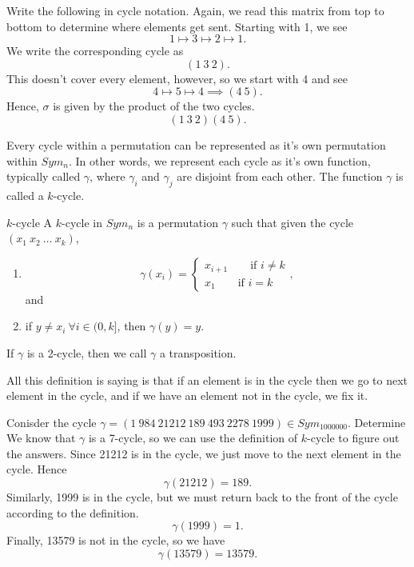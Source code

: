 \begin{example}{Write the following in cycle notation.}
	{\egft{
		\[
			\left[
			\begin{array}{c c c c c}
				1 & 2 & 3 & 4 & 5 \\
				3 & 1 & 2 & 5 & 4
			\end{array}
			\right]
		\]
	}}
	Again, we read this matrix from top to bottom to determine where elements get sent. Starting with 1, we see
	\[
		1\mapsto3\mapsto2\mapsto1.
	\]
	We write the corresponding cycle as
	\[
		(1\ 3\ 2).
	\]
	This doesn't cover every element, however, so we start with 4 and see
	\[
		4\mapsto5\mapsto4\implies(4\ 5).
	\]
	Hence, $\sigma$ is given by the product of the two cycles.
	\[
		(1\ 3\ 2)(4\ 5).
	\]
\end{example}
Every cycle within a permutation can be represented as it's own permutation within $Sym_{n}$. In other words, we represent each cycle as it's own function, typically called $\gamma$, where $\gamma_{i}$ and $\gamma_{j}$ are disjoint from each other. The function $\gamma$ is called a $k$-cycle.
\begin{definition}{$k$-cycle}
	A $k$-cycle in $Sym_{n}$ is a permutation $\gamma$ such that given the cycle $(x_{1}\ x_{2}\ \dots\ x_{k})$,
	\begin{enumerate}
		\item
		      \[
		      	\gamma(x_{i})=
		      	\begin{cases}
		      		x_{i+1}\qquad\text{if }i\neq k \\
		      		x_{1}\qquad\text{if }i = k
		      	\end{cases},
		      \]
		      and
		\item if $y\neq x_{i}\ \forall i\in(0,k]$, then $\gamma(y)=y$.
	\end{enumerate}
    If $\gamma$ is a 2-cycle, then we call $\gamma$ a transposition.
\end{definition}
All this definition is saying is that if an element is in the cycle then we go to next element in the cycle, and if we have an element not in the cycle, we fix it.

\begin{example}{Conisder the cycle $\gamma=(1\ 984\ 21212\ 189\ 493\ 2278\ 1999)\in Sym_{1000000}$. Determine}
	{}
    We know that $\gamma$ is a 7-cycle, so we can use the definition of $k$-cycle to figure out the answers. Since 21212 is in the cycle, we just move to the next element in the cycle. Hence
    \[
        \gamma(21212)=189.
    \]
    Similarly, 1999 is in the cycle, but we must return back to the front of the cycle according to the definition.
    \[
        \gamma(1999)=1.
    \]
    Finally, 13579 is not in the cycle, so we have
    \[
        \gamma(13579)=13579.
    \]
\end{example}

